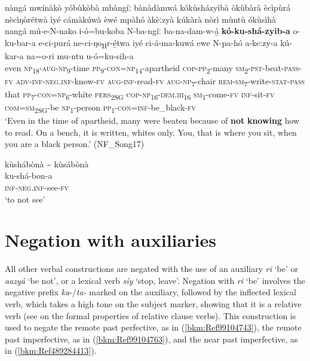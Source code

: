 \ea
\label{bkm:Ref99104690}
nàngá mwínàkò yóbùkòbà mbàngíː bànàdàmwá kókùsházyìbà òkùbàrà ècìpùrá nècìŋòrétwà ìyé cámàkúwà èwé mpàhó àkèːzyà kúkàrà nòrì mùntù ókùsìhà\\
\gll nangá  mú-e-N-nako  i-ó=bu-koba      N-ba-ngíː ba-na-dam-w-á̲    \textbf{kó-ku-shá-zyib-a}      o-ku-bar-a  e-ci-purá    ne-ci-ŋo\textsubscript{H}r-é̲twa    iyé  ci-á-ma-kuwá ewe    N-pa-hó    a-keːzy-a    kú-kar-a na=o-ri    mu-ntu  u-ó=ku-sih-a  \\
even  \textsc{np}\textsubscript{18}-\textsc{aug}-\textsc{np}\textsubscript{9}-time  \textsc{pp}\textsubscript{9}-\textsc{con}=\textsc{np}\textsubscript{14}-apartheid  \textsc{cop}-\textsc{pp}\textsubscript{2}-many
\textsc{sm}\textsubscript{2}-\textsc{pst}-beat-\textsc{pass}-\textsc{fv}  \textsc{adv}-\textsc{inf}-\textsc{neg}.\textsc{inf}-know-\textsc{fv}  \textsc{aug}-\textsc{inf}-read-\textsc{fv}
\textsc{aug}-\textsc{np}\textsubscript{7}-chair  \textsc{rem}-\textsc{sm}\textsubscript{7}-write-\textsc{stat}-\textsc{pass}  that  \textsc{pp}\textsubscript{7}-\textsc{con}=\textsc{np}\textsubscript{6}-white
\textsc{pers}\textsubscript{2SG}  \textsc{cop}-\textsc{np}\textsubscript{16}-\textsc{dem}.\textsc{iii}\textsubscript{16}  \textsc{sm}\textsubscript{1}-come-\textsc{fv}    \textsc{inf}-sit-\textsc{fv}
\textsc{com}=\textsc{sm}\textsubscript{2SG}-be  \textsc{np}\textsubscript{1}-person  \textsc{pp}\textsubscript{1}-\textsc{con}=\textsc{inf}-be\_black-\textsc{fv}\\
\glt ‘Even in the time of apartheid, many were beaten because of \textbf{not} \textbf{knowing} how to read. On a bench, it is written, whites only. You, that is where you sit, when you are a black person.’ (NF\_Song17)
\z

\ea
\label{bkm:Ref99104701}
\glll kùshábònà {\textasciitilde} kùsábònà\\
ku-shá-bon-a\\
\textsc{inf}-\textsc{neg}.\textsc{inf}-see-\textsc{fv}\\
\glt ‘to not see’
\z
\section{Negation with auxiliaries}
\label{bkm:Ref494466580}\hypertarget{Toc75352710}{}
All other verbal constructions are negated with the use of an auxiliary \textit{ri} ‘be’ or \textit{aazyá} ‘be not’, or a lexical verb \textit{síy} ‘stop, leave’. Negation with \textit{ri} ‘be’ involves the negative prefix \textit{ka}-/\textit{ta-} marked on the auxiliary, followed by the inflected lexical verb, which takes a high tone on the subject marker, showing that it is a relative verb (see  on the formal properties of relative clause verbs). This construction is used to negate the remote past perfective, as in (\ref{bkm:Ref99104743}), the remote past imperfective, as in (\ref{bkm:Ref99104763}), and the near past imperfective, as in (\ref{bkm:Ref489284413}).

